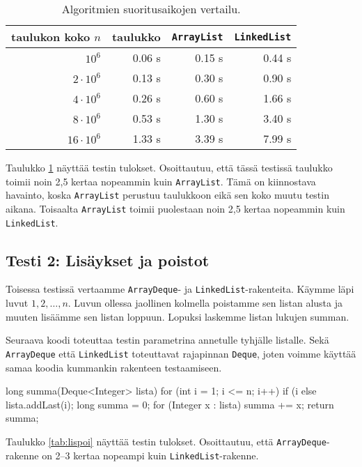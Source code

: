\begin{table}
\center
\begin{tabular}{rrrr}
taulukon koko $n$ & taulukko & \texttt{ArrayList} & \texttt{LinkedList} \\
\hline
$10^6$ & 0.06 s & 0.15 s & 0.44 s \\
$2 \cdot 10^6$ & 0.13 s & 0.30 s & 0.90 s \\
$4 \cdot 10^6$ & 0.26 s & 0.60 s & 1.66 s \\
$8 \cdot 10^6$ & 0.53 s & 1.30 s & 3.40 s \\
$16 \cdot 10^6$ & 1.33 s & 3.39 s & 7.99 s \\
\end{tabular}
\caption{Algoritmien suoritusaikojen vertailu.}
\label{tab:kerver}
\end{table}

Taulukko \ref{tab:kerver} näyttää testin tulokset.
Osoittautuu, että tässä testissä taulukko toimii noin
2,5 kertaa nopeammin kuin \texttt{ArrayList}.
Tämä on kiinnostava havainto, koska \texttt{ArrayList}
perustuu taulukkoon eikä sen koko muutu testin aikana.
Toisaalta \texttt{ArrayList} toimii puolestaan noin
2,5 kertaa nopeammin kuin \texttt{LinkedList}.

\subsection{Testi 2: Lisäykset ja poistot}

Toisessa testissä vertaamme \texttt{ArrayDeque}- ja \texttt{LinkedList}-rakenteita.
Käymme läpi luvut $1,2,\dots,n$.
Luvun ollessa jaollinen kolmella poistamme sen listan alusta
ja muuten lisäämme sen listan loppuun.
Lopuksi laskemme listan lukujen summan.

Seuraava koodi toteuttaa testin parametrina annetulle tyhjälle listalle.
Sekä \texttt{ArrayDeque} että \texttt{LinkedList} toteuttavat
rajapinnan \texttt{Deque}, joten voimme käyttää samaa koodia
kummankin rakenteen testaamiseen.

\begin{code}
long summa(Deque<Integer> lista) {
    for (int i = 1; i <= n; i++) {
        if (i%
        else lista.addLast(i);
    }
    long summa = 0;
    for (Integer x : lista) summa += x;
    return summa;
}
\end{code}

Taulukko \ref{tab:lispoi} näyttää testin tulokset.
Osoittautuu, että \texttt{ArrayDeque}-raken\-ne on
2–3 kertaa nopeampi kuin \texttt{LinkedList}-rakenne.

